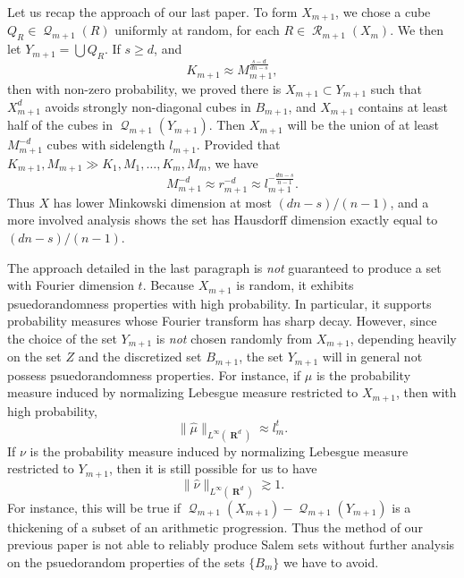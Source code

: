 \documentclass[12pt,reqno]{article}
\numberwithin{equation}{section}
\DeclareMathOperator{\RR}{\mathbf{R}}
\DeclareMathOperator{\DQ}{\mathcal{Q}}
\DeclareMathOperator{\DR}{\mathcal{R}}
\begin{document}
Let us recap the approach of our last paper. To form $X_{m+1}$, we chose a cube $Q_R \in \DQ_{m+1}(R)$ uniformly at random, for each $R \in \DR_{m+1}(X_m)$. We then let $Y_{m+1} = \bigcup Q_R$. If $s \geq d$, and
%
\begin{equation} \label{equation12904190249102}
    K_{m+1} \approx M_{m+1}^{\frac{s - d}{dn - s}},
\end{equation}
%
then with non-zero probability, we proved there is $X_{m+1} \subset Y_{m+1}$ such that $X_{m+1}^d$ avoids strongly non-diagonal cubes in $B_{m+1}$, and $X_{m+1}$ contains at least half of the cubes in $\DQ_{m+1}(Y_{m+1})$. Then $X_{m+1}$ will be the union of at least $M_{m+1}^{-d}$ cubes with sidelength $l_{m+1}$. Provided that $K_{m+1}, M_{m+1} \gg K_1, M_1, \dots, K_m, M_m$, we have
%
\[ M_{m+1}^{-d} \approx r_{m+1}^{-d} \approx l_{m+1}^{-\frac{dn - s}{n-1}}. \]
%
Thus $X$ has lower Minkowski dimension at most $(dn - s)/(n-1)$, and a more involved analysis shows the set has Hausdorff dimension exactly equal to $(dn - s)/(n-1)$.

The approach detailed in the last paragraph is \emph{not} guaranteed to produce a set with Fourier dimension $t$. Because $X_{m+1}$ is random, it exhibits psuedorandomness properties with high probability. In particular, it supports probability measures whose Fourier transform has sharp decay. However, since the choice of the set $Y_{m+1}$ is \emph{not} chosen randomly from $X_{m+1}$, depending heavily on the set $Z$ and the discretized set $B_{m+1}$, the set $Y_{m+1}$ will in general not possess psuedorandomness properties. For instance, if $\mu$ is the probability measure induced by normalizing Lebesgue measure restricted to $X_{m+1}$, then with high probability,
%
\[ \| \widehat{\mu} \|_{L^\infty(\RR^d)} \approx l_m^t. \]
%
If $\nu$ is the probability measure induced by normalizing Lebesgue measure restricted to $Y_{m+1}$, then it is still possible for us to have
%
\[ \| \widehat{\nu} \|_{L^\infty(\RR^d)} \gtrsim 1. \]
%
For instance, this will be true if $\DQ_{m+1}(X_{m+1}) - \DQ_{m+1}(Y_{m+1})$ is a thickening of a subset of an arithmetic progression. Thus the method of our previous paper is not able to reliably produce Salem sets without further analysis on the psuedorandom properties of the sets $\{ B_m \}$ we have to avoid.
\end{document}
